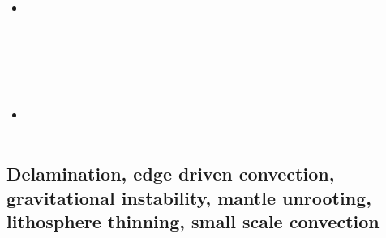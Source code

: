 \begin{scriptsize}
\begin{itemize}
\textcite{bemc18} \\
\textcite{neew18} \\
\textcite{stbe18} \\
\item[\twothousandnineteen] 
\textcite{koen19} \\
\textcite{kipd19} \\
\textcite{crcm19} \\
\textcite{pedm19} \\
\textcite{mazz19} \\
\textcite{chch19} \\
\item[\twothousandtwenty] 
\textcite{yamq20} \\ 
\textcite{miko20} \\ 
\end{itemize}
\end{scriptsize}


\subsection{Delamination, edge driven convection, gravitational instability, mantle unrooting, lithosphere thinning, small scale convection} 

